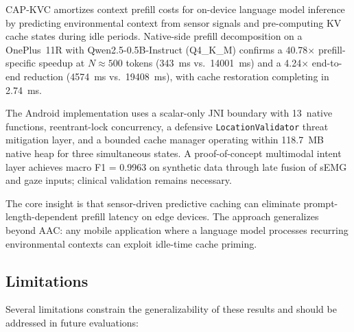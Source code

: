 \documentclass[journal]{IEEEtran}
\begin{document}
CAP-KVC amortizes context prefill costs for on-device language model inference by predicting environmental context from sensor signals and pre-computing KV cache states during idle periods. Native-side prefill decomposition on a OnePlus~11R with Qwen2.5-0.5B-Instruct (Q4\_K\_M) confirms a 40.78$\times$ prefill-specific speedup at $N \approx 500$ tokens (343~ms vs.\ 14001~ms) and a 4.24$\times$ end-to-end reduction (4574~ms vs.\ 19408~ms), with cache restoration completing in 2.74~ms.

The Android implementation uses a scalar-only JNI boundary with 13~native functions, reentrant-lock concurrency, a defensive \texttt{LocationValidator} threat mitigation layer, and a bounded cache manager operating within 118.7~MB native heap for three simultaneous states. A proof-of-concept multimodal intent layer achieves macro F1 = 0.9963 on synthetic data through late fusion of sEMG and gaze inputs; clinical validation remains necessary.

The core insight is that sensor-driven predictive caching can eliminate prompt-length-dependent prefill latency on edge devices. The approach generalizes beyond AAC: any mobile application where a language model processes recurring environmental contexts can exploit idle-time cache priming.

\subsection{Limitations}
\label{sec:limitations}

Several limitations constrain the generalizability of these results and should be addressed in future evaluations:
\end{document}
